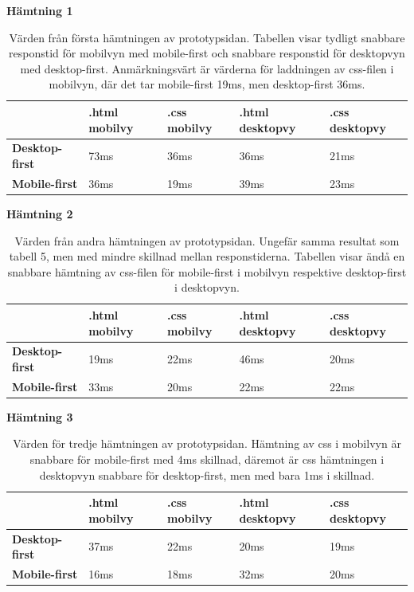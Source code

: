 \documentclass[11pt]{article}
\begin{document}
\newpage
\textbf{Hämtning 1}

\begin{table}[H]
	\centering
	\begin{tabular}{|p{2.5cm}|p{2.7cm}|p{2.4cm}|p{3.1cm}|p{2.8cm}|}
	\hline
	~&\textbf{.html mobilvy}&\textbf{.css mobilvy}&\textbf{.html desktopvy}&\textbf{.css desktopvy}\\ \hline
	\textbf{Desktop-first}&73ms&36ms&36ms&21ms\\ \hline
	\textbf{Mobile-first}&36ms&19ms&39ms&23ms \\ \hline
	\end{tabular}
    \caption {Värden från första hämtningen av prototypsidan. Tabellen visar tydligt snabbare responstid för mobilvyn med mobile-first och snabbare responstid för desktopvyn med desktop-first. Anmärkningsvärt är värderna för laddningen av css-filen i mobilvyn, där det tar mobile-first 19ms, men desktop-first 36ms.}
\end{table}

\textbf{Hämtning 2}

\begin{table}[H]
	\centering
	\begin{tabular}{|p{2.5cm}|p{2.7cm}|p{2.4cm}|p{3.1cm}|p{2.8cm}|}
	\hline
	~&\textbf{.html mobilvy}&\textbf{.css mobilvy}&\textbf{.html desktopvy}&\textbf{.css desktopvy}\\ \hline
	\textbf{Desktop-first}&19ms&22ms&46ms&20ms\\ \hline
	\textbf{Mobile-first}&33ms&20ms&22ms&22ms \\ \hline
	\end{tabular}
    \caption {Värden från andra hämtningen av prototypsidan. Ungefär samma resultat som tabell 5, men med mindre skillnad mellan responstiderna. Tabellen visar ändå en snabbare hämtning av css-filen för mobile-first i mobilvyn respektive desktop-first i desktopvyn.}
\end{table}

\textbf{Hämtning 3}

\begin{table}[H]
	\centering
	\begin{tabular}{|p{2.5cm}|p{2.7cm}|p{2.4cm}|p{3.1cm}|p{2.8cm}|}
	\hline
	~&\textbf{.html mobilvy}&\textbf{.css mobilvy}&\textbf{.html desktopvy}&\textbf{.css desktopvy}\\ \hline
	\textbf{Desktop-first}&37ms&22ms&20ms&19ms\\ \hline
	\textbf{Mobile-first}&16ms&18ms&32ms&20ms \\ \hline
	\end{tabular}
    \caption {Värden för tredje hämtningen av prototypsidan. Hämtning av css i mobilvyn är snabbare för mobile-first med 4ms skillnad, däremot är css hämtningen i desktopvyn snabbare för desktop-first, men med bara 1ms i skillnad.}
\end{table}
\end{document}
